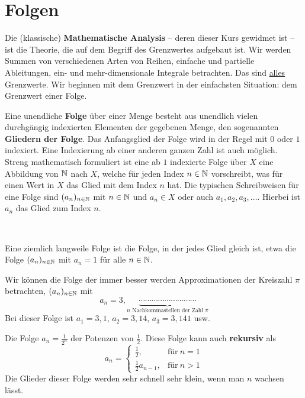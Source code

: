 \section{Folgen}


\begin{bem}
Die (klassische) \textbf{Mathematische Analysis} -- deren dieser Kurs gewidmet ist -- ist die Theorie, die auf dem Begriff des Grenzwertes aufgebaut ist. Wir werden Summen von verschiedenen Arten von Reihen, einfache und partielle Ableitungen, ein- und mehr-dimensionale Integrale betrachten. Das sind \underline{alles} Grenzwerte. Wir beginnen mit dem Grenzwert in der einfachsten Situation: dem Grenzwert einer Folge. 
\end{bem} 


\begin{defn}[Folge]  
	Eine unendliche \textbf{Folge} über einer Menge besteht aus unendlich vielen durchgängig indexierten Elementen der gegebenen Menge, den sogenannten \textbf{Gliedern der Folge}. Das Anfangsglied der Folge wird in der Regel mit $0$ oder $1$ indexiert. Eine Indexierung ab einer anderen ganzen Zahl ist auch möglich. Streng mathematisch formuliert ist eine ab $1$ indexierte Folge über $X$ eine Abbildung von $\mathbb{N}$ nach $X$, welche für jeden Index $n \in \mathbb{N}$ vorschreibt, was für einen Wert in $X$ das Glied mit dem Index $n$ hat. Die typischen Schreibweisen für eine Folge sind $(a_n)_{n \in \mathbb{N}}$ mit $n \in \mathbb{N}$ und $a_n \in X$ oder auch $a_1,a_2,a_3,\ldots$. Hierbei ist $a_n$ das Glied zum Index $n$. 
\end{defn} 

\begin{bsp} {\ } 
	\begin{enuma}
		\item Eine ziemlich langweile Folge ist die Folge, in der jedes Glied gleich ist, etwa die Folge $(a_n)_{n \in \mathbb{N}}$ mit $a_n=1$ für alle $n \in \mathbb{N}$. 
		\item Wir können die Folge der immer besser werden Approximationen der Kreiszahl $\pi$ betrachten, $(a_n)_{n \in \mathbb{N}}$ mit 
		\[ 
		a_n = 3{,} \underbrace{ \cdots\cdots\cdots\cdots\cdots\cdots\cdots\cdots\cdots }_{\text{$n$ Nachkommastellen der Zahl $\pi$}}
		\]
		Bei dieser Folge ist $a_1=3{,}1$, $a_2 = 3{,}14$, $a_3 = 3{,}141$ usw. 
		\item Die Folge $a_n = \frac{1}{2^n}$ der Potenzen von $\frac{1}{2}$. Diese Folge kann auch \textbf{rekursiv} als 
		\[ a_n =
		\begin{cases}
			\frac{1}{2}, & \text{für} \ n =1
			\\ \frac{1}{2} a_{n-1}, & \text{für} \ n  > 1
		\end{cases}
		\]
		Die Glieder dieser Folge werden sehr schnell sehr klein, wenn man $n$ wachsen lässt. 
	\end{enuma} 
\end{bsp} 

